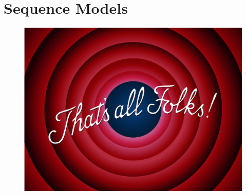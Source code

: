 \documentclass[11pt,fleqn,oneside]{book} %
\begin{document}
\newpage
\chapter{Sequence Models}


% 

% 

% 

% 

\newpage
{}

\begin{figure}[!htbp]
    \centering
    \includegraphics[width=\linewidth]{tikz/chapter12 - That's all Folks.png}
    \caption{}
\end{figure}
\end{document}
